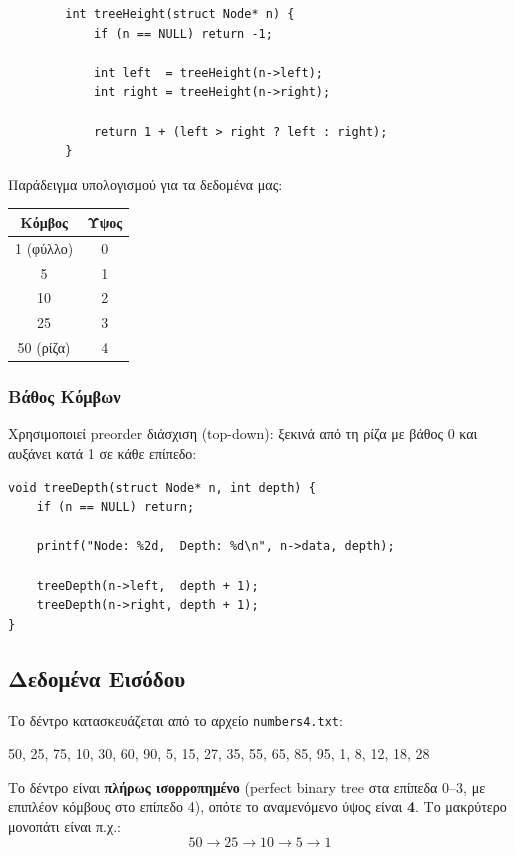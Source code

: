 \documentclass[a4paper,12pt]{article}
\begin{document}
	\begin{lstlisting}
		int treeHeight(struct Node* n) {
			if (n == NULL) return -1;
			
			int left  = treeHeight(n->left);
			int right = treeHeight(n->right);
			
			return 1 + (left > right ? left : right);
		}
	\end{lstlisting}
	
	Παράδειγμα υπολογισμού για τα δεδομένα μας:
	\begin{center}
		\begin{tabular}{|c|c|}
			\hline
			\textbf{Κόμβος} & \textbf{Ύψος} \\
			\hline
			1 (φύλλο) & 0 \\
			5          & 1 \\
			10         & 2 \\
			25         & 3 \\
			50 (ρίζα)  & 4 \\
			\hline
		\end{tabular}
	\end{center}
	
	\subsubsection{Βάθος Κόμβων}
	Χρησιμοποιεί preorder διάσχιση (top-down): ξεκινά από τη ρίζα με βάθος 0 
	και αυξάνει κατά 1 σε κάθε επίπεδο:
	
	\begin{lstlisting}
void treeDepth(struct Node* n, int depth) {
	if (n == NULL) return;
	
	printf("Node: %2d,  Depth: %d\n", n->data, depth);
	
	treeDepth(n->left,  depth + 1);
	treeDepth(n->right, depth + 1);
}
	\end{lstlisting}
	
	\subsection{Δεδομένα Εισόδου}
	Το δέντρο κατασκευάζεται από το αρχείο \texttt{numbers4.txt}:
	
	\begin{center}
		50, 25, 75, 10, 30, 60, 90, 5, 15, 27, 35, 55, 65, 85, 95, 1, 8, 12, 18, 28
	\end{center}
	
	Το δέντρο είναι \textbf{πλήρως ισορροπημένο} (perfect binary tree στα 
	επίπεδα 0--3, με επιπλέον κόμβους στο επίπεδο 4), οπότε το αναμενόμενο 
	ύψος είναι \textbf{4}. Το μακρύτερο μονοπάτι είναι π.χ.:
	$$50 \rightarrow 25 \rightarrow 10 \rightarrow 5 \rightarrow 1$$
\end{document}
